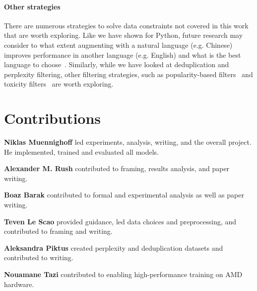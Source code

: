 \documentclass{article}
\begin{document}
\paragraph{Other strategies} There are numerous strategies to solve data constraints not covered in this work that are worth exploring. Like we have shown for Python, future research may consider to what extent augmenting with a natural language (e.g. Chinese) improves performance in another language (e.g. English) and what is the best language to choose~\cite{lin2019choosing,xia2021metaxl}. Similarly, while we have looked at deduplication and perplexity filtering, other filtering strategies, such as popularity-based filters~\cite{allal2023santacoder,zhao2023survey} and toxicity filters~\cite{gehman2020realtoxicityprompts,henderson2022pile,longpre2023pretrainers,prabhumoye2023adding,penedo2023refinedweb} are worth exploring.


\FloatBarrier

\section{Contributions}
\label{sec:contributions}

\textbf{Niklas Muennighoff} led experiments, analysis, writing, and the overall project. He implemented, trained and evaluated all models.

\textbf{Alexander M. Rush} contributed to framing, results analysis, and paper writing.

\textbf{Boaz Barak} contributed to formal and experimental analysis as well as paper writing.

\textbf{Teven Le Scao} provided guidance, led data choices and preprocessing, and contributed to framing and writing.

\textbf{Aleksandra Piktus} created perplexity and deduplication datasets and contributed to writing.

\textbf{Nouamane Tazi} contributed to enabling high-performance training on AMD hardware.
\end{document}
